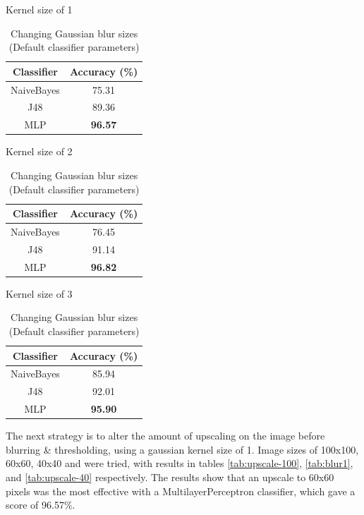 \documentclass[12pt]{article}
\begin{document}
    \begin{table}[H]
      \begin{subtable}{.329\linewidth}
        \centering
        \caption{Kernel size of 1}
        \begin{tabular}{c|c}
          \toprule
          \multicolumn{1}{c|}{Classifier} & \multicolumn{1}{c}{Accuracy (\%)} \\
          \midrule
          NaiveBayes & 75.31 \\
          J48   & 89.36 \\
          MLP   & \textbf{96.57} \\
          \bottomrule
        \end{tabular}%
        \label{tab:blur1}%
      \end{subtable}
      \begin{subtable}{.329\linewidth}
        \centering
        \caption{Kernel size of 2}
        \begin{tabular}{c|c}
          \toprule
          Classifier & Accuracy (\%) \\
          \midrule
          NaiveBayes & 76.45 \\
          J48   & 91.14 \\
          MLP   & \textbf{96.82} \\
          \bottomrule
        \end{tabular}%
        \label{tab:blur2}%
      \end{subtable}
      \begin{subtable}{.329\linewidth}
        \centering
        \caption{Kernel size of 3}
        \begin{tabular}{c|c}
          \toprule
          Classifier & Accuracy (\%) \\
          \midrule
          NaiveBayes & 85.94 \\
          J48   & 92.01 \\
          MLP   & \textbf{95.90} \\
          \bottomrule
        \end{tabular}%
        \label{tab:blur3}%
      \end{subtable}
      \caption{Changing Gaussian blur sizes (Default classifier parameters)}
      \label{tab:blur}
    \end{table}
    The next strategy is to alter the amount of upscaling on the image before blurring \& thresholding, using a gaussian kernel size of 1. Image sizes of 100x100, 60x60, 40x40 and  were tried, with results in tables \ref{tab:upscale-100}, \ref{tab:blur1}, and \ref{tab:upscale-40} respectively. The results show that an upscale to 60x60 pixels was the most effective with a MultilayerPerceptron classifier, which gave a score of 96.57\%.
\end{document}
